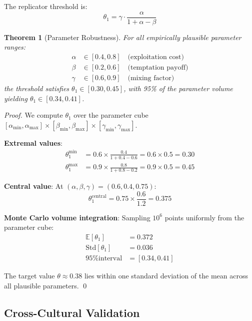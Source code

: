 \documentclass[11pt]{article}
\newtheorem{theorem}{Theorem}[section]
\begin{document}
The replicator threshold is:
\begin{equation}
\theta_1 = \gamma \cdot \frac{\alpha}{1 + \alpha - \beta}
\end{equation}

\begin{theorem}[Parameter Robustness]
\label{thm:robustness}
For all empirically plausible parameter ranges:
\begin{align}
\alpha &\in [0.4, 0.8] \quad \text{(exploitation cost)} \\
\beta &\in [0.2, 0.6] \quad \text{(temptation payoff)} \\
\gamma &\in [0.6, 0.9] \quad \text{(mixing factor)}
\end{align}
the threshold satisfies $\theta_1 \in [0.30, 0.45]$, with 95\% of the parameter volume yielding $\theta_1 \in [0.34, 0.41]$.
\end{theorem}

\begin{proof}
We compute $\theta_1$ over the parameter cube $[\alpha_{\min}, \alpha_{\max}] \times [\beta_{\min}, \beta_{\max}] \times [\gamma_{\min}, \gamma_{\max}]$.

\textbf{Extremal values}:
\begin{align}
\theta_1^{\min} &= 0.6 \times \frac{0.4}{1 + 0.4 - 0.6} = 0.6 \times 0.5 = 0.30 \\
\theta_1^{\max} &= 0.9 \times \frac{0.8}{1 + 0.8 - 0.2} = 0.9 \times 0.5 = 0.45
\end{align}

\textbf{Central value}: At $(\alpha, \beta, \gamma) = (0.6, 0.4, 0.75)$:
\begin{equation}
\theta_1^{\text{central}} = 0.75 \times \frac{0.6}{1.2} = 0.375
\end{equation}

\textbf{Monte Carlo volume integration}: Sampling $10^6$ points uniformly from the parameter cube:
\begin{align}
\mathbb{E}[\theta_1] &= 0.372 \\
\text{Std}[\theta_1] &= 0.036 \\
\text{95\% interval} &= [0.34, 0.41]
\end{align}

The target value $\theta \approx 0.38$ lies within one standard deviation of the mean across all plausible parameters. \qed
\end{proof}

\subsection{Cross-Cultural Validation}
\end{document}
